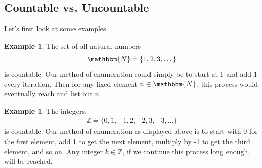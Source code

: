 \documentclass{tufte-book}
\newcommand\nat{\mathbbm{N}}
\theoremstyle{definition}
\numberwithin{theorem}{section}
\numberwithin{definition}{section}
\numberwithin{lemma}{section}
\numberwithin{corollary}{section}
\numberwithin{proposition}{section}
\numberwithin{remark}{section}
\numberwithin{claim}{section}
\numberwithin{observation}{section}
\numberwithin{fact}{section}
\numberwithin{assumption}{section}
\newtheorem{example}[theorem]{Example}
\numberwithin{example}{section}
\numberwithin{exercise}{section}
\begin{document}
\subsection{Countable vs. Uncountable}
Let's first look at some examples.

\begin{example}
The set of all natural numbers
\begin{align*}
\nat \doteq \{1,2,3,\dots\}
\end{align*}
is countable. Our method of enumeration could simply be to start at 1 and add 1 every iteration. Then for any fixed element $n \in \nat$, this process would eventually reach and list out $n$.
\end{example}

\begin{example}
The integers,
\begin{align*}
\mathbb{Z} \doteq \{0,1,-1,2,-2,3,-3,\dots\}
\end{align*}
is countable. Our method of enumeration as displayed above is to start with 0 for the first element, add 1 to get the next element, multiply by -1 to get the third element, and so on. Any integer $k \in \mathbb{Z}$, if we continue this process long enough, will be reached.
\end{example}
\end{document}
